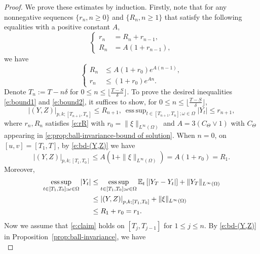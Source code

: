 \documentclass[11pt,reqno]{amsart}
\DeclareMathOperator*{\esssup}{ess\,sup}
\numberwithin{equation}{section}
\begin{document}
\begin{proof} 
We prove these estimates by induction. Firstly, note that for any nonnegative sequences $\{r_n, n\ge 0\}$ and $\{R_n, n\ge 1\}$ that satisfy the following equalities with a positive constant $A,$
\begin{equation*}
\left\{\begin{aligned}
r_{n}&=R_{n} + r_{n-1},\\
R_{n}&=A(1+r_{n-1}),
\end{aligned}
\right.
\end{equation*}
we have 
\begin{equation}\label{e:rR}
\left\{\begin{aligned}
R_n & \le A(1+r_0) e^{A(n-1)},\\
r_n &\le (1+r_0) e^{An}.
\end{aligned}
\right.
\end{equation}
Denote $T_{n} := T-n\delta$ for $0 \le n \le \lfloor\frac{T-S}{\delta} \rfloor$.  To prove  the desired inequalities \eqref{e:bound1} and \eqref{e:bound2}, it suffices to show, for $0 \le n \le \lfloor\frac{T-S}{\delta} \rfloor$,			
\begin{equation}\label{e:claim}
\left|(Y,Z)\right|_{p,k;[T_{n+1},T_{n}]} \le R_{n+1}, ~ \esssup_{t\in[T_{n+1},T_{n}];\omega\in\Omega}|Y_{t}|\le r_{n+1},
\end{equation}
where $r_n, R_n$ satisfies \eqref{e:rR} with  $r_{0} = \|\xi\|_{L^{\infty}(\Omega)}$ and $A = 3(C_{\Theta}\vee 1)$ with $C_{\Theta}$ appearing in \eqref{e:prop:ball-invariance-bound of solution}. When $n=0$, on $[u,v]=[T_1, T]$, by \eqref{e:bd-(Y,Z)} we have
\begin{equation*}
\left|(Y,Z)\right|_{p,k;[T_{1},T_{0}]}\le A(1+\|\xi\|_{L^{\infty}(\Omega)}) = A (1 + r_{0}) = R_{1}.
\end{equation*}
Moreover,
\begin{align*}
\esssup_{t\in[T_{1},T_{0}];\omega\in\Omega}\left|Y_{t}\right|&\le \esssup_{t\in[T_{1},T_{0}];\omega\in\Omega}\mathbb{E}_{t}\left[|Y_{T} - Y_{t}|\right] + \|Y_{T}\|_{L^{\infty}(\Omega)}\\
& \le \left|(Y,Z)\right|_{p,k;[T_{1},T_{0}]} + \|\xi\|_{L^{\infty}(\Omega)} \notag\\
& \le R_{1} + r_{0} = r_{1}.\notag
\end{align*}
Now we assume that  \eqref{e:claim} holds  on $[T_{j},T_{j-1}]$ for $1\le j\le n$. By \eqref{e:bd-(Y,Z)} in Proposition~\ref{prop:ball-invariance}, we have
\begin{equation*}

\end{equation*}
\end{proof}
\end{document}
